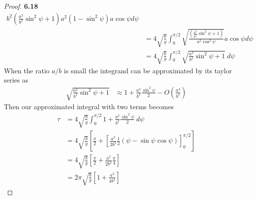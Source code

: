 \documentclass[11pt]{article}
\theoremstyle{definition}
\begin{document}
\begin{proof}{\textbf{6.18}}
\begin{align*}
{{                    b^2(\frac{a^2}{b^2}\sin^2\psi+1)}{a^2(1 - \sin^2\psi)}}a\cos\psi d\psi\\
                &= 4\sqrt{\frac{b}{g}} \int_0^{\pi/2} \sqrt{\frac{
                    (\frac{a^2}{b^2}\sin^2\psi+1)}{a^2 \cos^2\psi}}a\cos\psi d\psi\\
                &= 4\sqrt{\frac{b}{g}} \int_0^{\pi/2} \sqrt{\frac{a^2}{b^2}\sin^2\psi+1}~ d\psi
        \end{align*}
        When the ratio $a/b$ is small the integrand can be approximated by its taylor
        series as
        \begin{align*}
            \sqrt{\frac{a^2}{b^2}\sin^2\psi+1} &\approx 1 + \frac{a^2}{b^2}\frac{\sin^2\psi}{2} - O(\frac{a^4}{b^4}) 
        \end{align*}
        Then our approximated integral with two terms becomes
        \begin{align*}
            \tau &= 4\sqrt{\frac{b}{g}} \int_0^{\pi/2} 1 + \frac{a^2}{b^2}\frac{\sin^2\psi}{2} ~d\psi\\
                &= 4\sqrt{\frac{b}{g}} \left[\frac{\pi}{2} + \left[\frac{a^2}{2b^2}\frac{1}{2}(\psi - \sin\psi \cos \psi)\right]_0^{\pi/2}\right]\\
                &= 4\sqrt{\frac{b}{g}} \left[\frac{\pi}{2} + \frac{a^2}{2b^2}\frac{\pi}{4}\right]\\
                &= 2\pi\sqrt{\frac{b}{g}} \left[1 + \frac{a^2}{4b^2}\right]
        \end{align*}
    \end{proof}
\cleardoublepage
\end{document}
